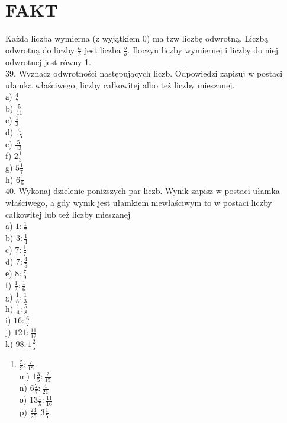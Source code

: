 \documentclass[10pt]{article}
\begin{document}
\section*{FAKT}
Każda liczba wymierna (z wyjątkiem 0) ma tzw liczbę odwrotną. Liczbą odwrotną do liczby \(\frac{a}{b}\) jest liczba \(\frac{b}{a}\). Iloczyn liczby wymiernej i liczby do niej odwrotnej jest równy 1.\\
39. Wyznacz odwrotności następujących liczb. Odpowiedzi zapisuj w postaci ułamka właściwego, liczby całkowitej albo też liczby mieszanej.\\
а) \(\frac{4}{7}\)\\
b) \(\frac{5}{11}\)\\
c) \(\frac{1}{3}\)\\
d) \(\frac{4}{15}\)\\
e) \(\frac{5}{13}\)\\
f) \(2 \frac{1}{3}\)\\
g) \(5 \frac{1}{7}\)\\
h) \(6 \frac{1}{6}\)\\
40. Wykonaj dzielenie poniższych par liczb. Wynik zapisz w postaci ułamka właściwego, a gdy wynik jest ułamkiem niewłaściwym to w postaci liczby całkowitej lub też liczby mieszanej\\
a) \(1: \frac{1}{7}\)\\
b) \(3: \frac{1}{4}\)\\
c) \(7: \frac{1}{7}\)\\
d) \(7: \frac{4}{5}\)\\
е) \(8: \frac{7}{9}\)\\
f) \(\frac{1}{3}: \frac{1}{6}\)\\
g) \(\frac{1}{8}: \frac{1}{3}\)\\
h) \(\frac{1}{4}: \frac{5}{8}\)\\
i) \(16: \frac{6}{7}\)\\
j) \(121: \frac{11}{12}\)\\
k) \(98: 1 \frac{2}{5}\)

\begin{enumerate}
  \item \(\frac{5}{9}: \frac{7}{18}\)\\
m) \(1 \frac{3}{5}: \frac{2}{15}\)\\
n) \(6 \frac{2}{7}: \frac{4}{21}\)\\
о) \(13 \frac{1}{5}: \frac{11}{16}\)\\
p) \(\frac{24}{25}: 3 \frac{1}{5}\).
\end{enumerate}
\end{document}

